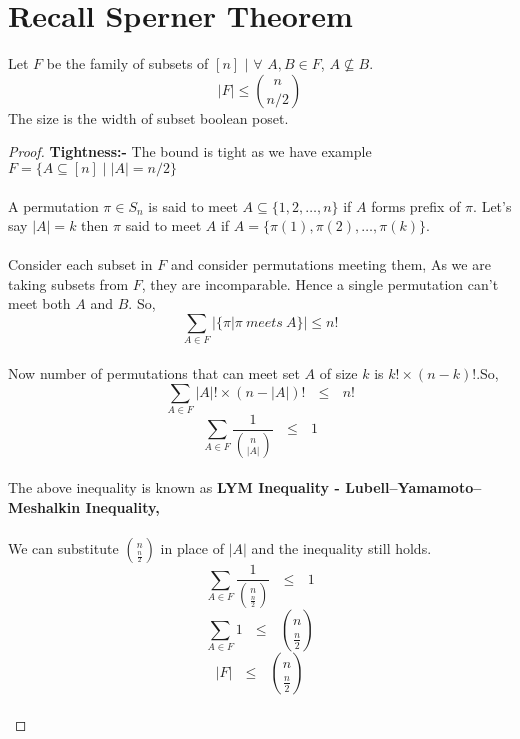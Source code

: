 
\section{Recall Sperner Theorem}
\begin{theorem}
Let $F$ be the family of subsets of $[n]$ $|$ $\forall$ $A,B \in F$, $A \nsubseteq B$.
$$|F| \le {n\choose{n/2}}$$
The size is the width of subset boolean poset.
\begin{proof}
\textbf{Tightness:-} The bound is tight as we have example $F=\{A\subseteq [n] \mid \left |A\right |=n/2\}$\\\\
 A permutation $\pi \in S_n$ is said to meet $A \subseteq \{1,2,\ldots,n\}$ if $A$ forms prefix of $\pi$. Let's say $|A| = k$ then $\pi$ said to meet $A$ if $A = \{\pi(1),\pi(2),\ldots,\pi(k)\}$.\\\\
Consider each subset in $F$ and consider permutations meeting them, As we are taking subsets from $F$, they are incomparable. Hence a single permutation can't meet both $A$ and $B$. So,
$$\sum_{A\in F} \bigg|\{\pi | \pi ~meets~ A\}\bigg| \leq n!$$\\
Now number of permutations that can meet set $A$ of size $k$ is $k! \times (n-k)!$.So,
$$\sum_{A\in F} |A|! \times (n-|A|)! ~~~\leq~~~ n!$$
$$\boxed{\sum_{A\in F} \frac{1}{{n \choose {|A|}}} ~~~ \leq ~~~ 1}$$\\
The above inequality is known as \textbf{LYM Inequality -  Lubell–Yamamoto–Meshalkin Inequality,}\\\\
We can substitute $n \choose \frac{n}{2}$ in place of $|A|$ and the inequality still holds.
$$\sum_{A\in F} \frac{1}{{n \choose \frac{n}{2}}} ~~~ \leq ~~~ 1$$
$$\sum_{A\in F} 1  ~~~ \leq ~~~ {n \choose \frac{n}{2}}$$
$$|F| ~~~\leq~~~ {n \choose \frac{n}{2}}$$\\
\end{proof}
\end{theorem}
